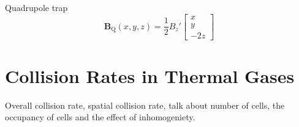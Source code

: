 Quadrupole trap
\begin{equation}
    \mathbf{B}_{\mathrm{Q}}(x,y,z) = \frac{1}{2} B_z' \begin{bmatrix} x\\ y\\ -2z \end{bmatrix} \label{eq:quad_field}
\end{equation}


\section{Collision Rates in Thermal Gases} \label{sec:collisionRates}

Overall collision rate, spatial collision rate, talk about number of cells, the occupancy of cells and the effect of inhomogeniety.
 
